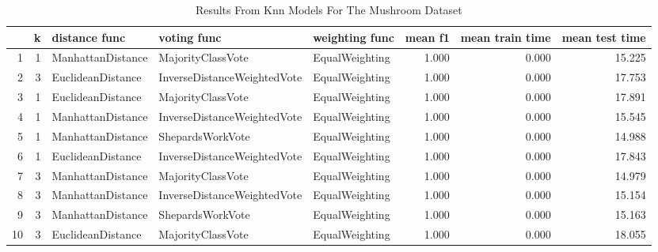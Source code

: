 \begin{table}
\centering
\caption{Results From Knn Models For The Mushroom Dataset}
\label{tab:knn_results_mushroom}
\begin{tabular}{rrlllrrr}
\toprule
 & k & distance func & voting func & weighting func & mean f1 & mean train time & mean test time \\
\midrule
1 & 1 & ManhattanDistance & MajorityClassVote & EqualWeighting & 1.000 & 0.000 & 15.225 \\
2 & 3 & EuclideanDistance & InverseDistanceWeightedVote & EqualWeighting & 1.000 & 0.000 & 17.753 \\
3 & 1 & EuclideanDistance & MajorityClassVote & EqualWeighting & 1.000 & 0.000 & 17.891 \\
4 & 1 & ManhattanDistance & InverseDistanceWeightedVote & EqualWeighting & 1.000 & 0.000 & 15.545 \\
5 & 1 & ManhattanDistance & ShepardsWorkVote & EqualWeighting & 1.000 & 0.000 & 14.988 \\
6 & 1 & EuclideanDistance & InverseDistanceWeightedVote & EqualWeighting & 1.000 & 0.000 & 17.843 \\
7 & 3 & ManhattanDistance & MajorityClassVote & EqualWeighting & 1.000 & 0.000 & 14.979 \\
8 & 3 & ManhattanDistance & InverseDistanceWeightedVote & EqualWeighting & 1.000 & 0.000 & 15.154 \\
9 & 3 & ManhattanDistance & ShepardsWorkVote & EqualWeighting & 1.000 & 0.000 & 15.163 \\
10 & 3 & EuclideanDistance & MajorityClassVote & EqualWeighting & 1.000 & 0.000 & 18.055 \\
\bottomrule
\end{tabular}
\end{table}
